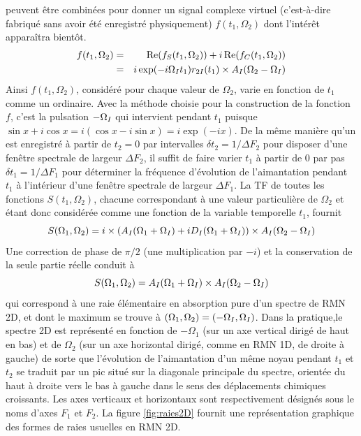 peuvent être combinées pour donner un signal complexe virtuel (c'est-à-dire fabriqué
sans avoir été enregistré physiquement) $f(t_1, \Omega_2)$
dont l'intérêt apparaîtra bientôt.
\begin{eqnarray}
f(t_1, \Omega_2) & = & \operatorname{Re}(f_S(t_1, \Omega_2)) + i\operatorname{Re}(f_C(t_1, \Omega_2)) \\
\label{eq:rmn2d1:virtuel}
                 & = & i \exp(-i \Omega_I t_1) r_{2I}(t_1) \times A_I(\Omega_2-\Omega_I)
\end{eqnarray}
Ainsi $f(t_1, \Omega_2)$, considéré pour chaque valeur de $\Omega_2$,
varie en fonction de $t_1$ comme un {\FID} ordinaire.
Avec la méthode choisie pour la construction de la fonction $f$,
c'est la pulsation $-\Omega_I$ qui intervient pendant $t_1$
puisque $\sin x + i\cos x = i(\cos x - i \sin x) = i\exp(-ix)$.
De la même manière qu'un {\FID} est enregistré à partir de $t_2 = 0$ par intervalles
$\delta t_2 = 1/\Delta F_2$ pour
disposer d'une fenêtre spectrale de largeur $\Delta F_2$,
il suffit de faire varier $t_1$ à partir de 0 
par pas $\delta t_1 = 1/\Delta F_1$ pour déterminer
la fréquence d'évolution de l'aimantation pendant $t_1$
à l'intérieur d'une fenêtre spectrale de largeur $\Delta F_1$.
La TF de toutes les fonctions $S(t_1, \Omega_2)$, chacune correspondant 
à une valeur particulière de $\Omega_2$ et étant donc considérée comme une fonction
de la variable temporelle $t_1$, fournit
\begin{equation}
S(\Omega_1, \Omega_2) = i \times (A_I(\Omega_1+\Omega_I) + iD_I(\Omega_1+\Omega_I)) 
\times A_I(\Omega_2-\Omega_I)
\end{equation}
Une correction de phase de $\pi/2$ (une multiplication par $-i$) et la conservation de la seule
partie réelle conduit à
\begin{equation}
S(\Omega_1, \Omega_2) = A_I(\Omega_1+\Omega_I)  \times A_I(\Omega_2-\Omega_I)
\end{equation}
qui correspond à une raie élémentaire en absorption pure d'un spectre de RMN 2D,
et dont le maximum se trouve à $(\Omega_1, \Omega_2) = (-\Omega_I, \Omega_I)$.
Dans la pratique,le spectre 2D
est représenté en fonction de $-\Omega_1$ (sur un axe vertical dirigé de haut en bas)
et de $\Omega_2$ (sur un axe horizontal dirigé, comme en RMN 1D, de droite à gauche)
de sorte que l'évolution de l'aimantation
d'un même noyau pendant $t_1$ et $t_2$ se traduit par un pic situé sur la diagonale principale
du spectre, orientée du haut à droite vers le bas à gauche
dans le sens des déplacements chimiques croissants.
Les axes verticaux et horizontaux sont respectivement désignés sous le noms d'axes $F_1$ et $F_2$.
La figure \ref{fig:raies2D} fournit une représentation graphique
des formes de raies usuelles en RMN 2D.

